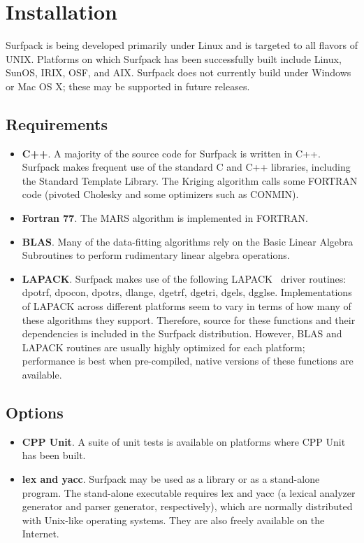 \documentclass{article}
\begin{document}
\section{Installation}\label{sec:installation}
Surfpack is being developed primarily under Linux and is targeted to all flavors of UNIX.  Platforms on which Surfpack has been successfully built include Linux, SunOS, IRIX, OSF, and AIX.  Surfpack does not currently build under Windows or Mac OS X; these may be supported in future releases.
\subsection{Requirements}
\begin{itemize}
\item {\bf C++}.  A majority of the source code for Surfpack is written in C++.  Surfpack makes frequent use of the standard C and C++ libraries, including the Standard Template Library.  The Kriging algorithm calls some FORTRAN code (pivoted Cholesky and some optimizers such as CONMIN).  
\item {\bf Fortran 77}.  The MARS algorithm is implemented in FORTRAN.  
\item {\bf BLAS}.  Many of the data-fitting algorithms rely on the Basic Linear Algebra Subroutines to perform rudimentary linear algebra operations.
\item {\bf LAPACK}.  Surfpack makes use of the following LAPACK~\cite{anderson}  driver routines: dpotrf, dpocon, dpotrs, dlange, dgetrf, dgetri, dgels, dgglse.  Implementations of LAPACK across different platforms seem to vary in terms of how many of these algorithms they support.  Therefore, source for these functions and their dependencies is included in the Surfpack distribution.  However, BLAS and LAPACK routines are usually highly optimized for each platform; performance is best when pre-compiled, native versions of these functions are available.
\end{itemize}
\subsection{Options}
\begin{itemize}
\item {\bf CPP Unit}.  A suite of unit tests is available on platforms where CPP Unit has been built.
\item {\bf lex and yacc}. Surfpack may be used as a library or as a stand-alone program.  The stand-alone executable requires lex and yacc (a lexical analyzer generator and parser generator, respectively), which are normally distributed with Unix-like operating systems.  They are also freely available on the Internet.
\end{itemize}
\end{document}
